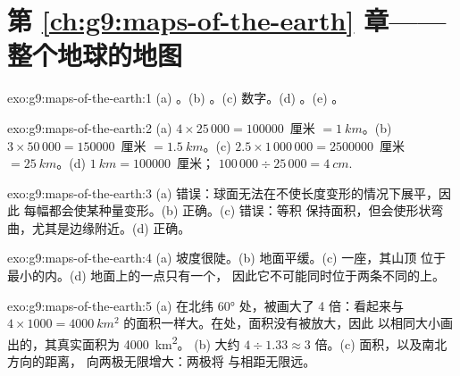 \section*{第 \ref{ch:g9:maps-of-the-earth} 章——整个地球的地图}

\begin{solution}{exo:g9:maps-of-the-earth:1}
(a) 。(b) 。(c) 数字。(d)
。(e) 。
\end{solution}

\begin{solution}{exo:g9:maps-of-the-earth:2}
(a) $4 \times 25\,000 = \num{100000}$~厘米 $= \qty{1}{km}$。(b) $3 \times
50\,000 = \num{150000}$~厘米 $= \qty{1.5}{km}$。(c) $2.5 \times 1\,000\,000
= \num{2500000}$~厘米 $= \qty{25}{km}$。(d) $\qty{1}{km} = \num{100000}$~厘米；
$100\,000 \div 25\,000 = \qty{4}{cm}$.
\end{solution}

\begin{solution}{exo:g9:maps-of-the-earth:3}
(a) 错误：球面无法在不使长度变形的情况下展平，因此
每幅都会使某种量变形。(b) 正确。(c) 错误：等积
保持面积，但会使形状弯曲，尤其是边缘附近。(d) 正确。
\end{solution}

\begin{solution}{exo:g9:maps-of-the-earth:4}
(a) 坡度很陡。(b) 地面平缓。(c) 一座，其山顶
位于最小的内。(d) 地面上的一点只有一个，
因此它不可能同时位于两条不同的上。
\end{solution}

\begin{solution}{exo:g9:maps-of-the-earth:5}
(a) 在北纬 \ang{60} 处，被画大了 4 倍：看起来与
$4 \times 1000 = \qty{4000}{km^2}$ 的面积一样大。在处，面积没有被放大，因此
以相同大小画出的，其真实面积为 \qty{4000}{km^2}。
(b) 大约 $4 \div 1.33 \approx 3$ 倍。(c) 面积，以及南北方向的距离，
向两极无限增大：两极将
与相距无限远。
\end{solution}

